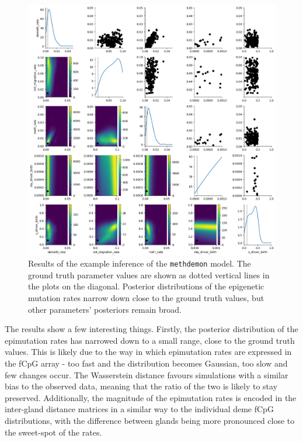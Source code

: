\begin{figure}[h]
    \centering
    \includegraphics[width=\textwidth]{Chapter_4/figures/example_inference.png}
    \caption{Results of the example inference of the \texttt{methdemon} model.
    The ground truth parameter values are shown as dotted vertical lines in the
    plots on the diagonal. Posterior distributions of the epigenetic mutation
    rates narrow down close to the ground truth values, but other parameters'
    posteriors remain broad.}
    \label{fig:example_inference}
\end{figure}
\clearpage
The results show a few interesting things. Firstly, the posterior distribution
of the epimutation rates has narrowed down to a small range, close to the ground
truth values. This is likely due to the way in which epimutation rates are
expressed in the fCpG array - too fast and the distribution becomes Gaussian,
too slow and few changes occur. The Wasserstein distance favours simulations
with a similar bias to the observed data, meaning that the ratio of the two is
likely to stay preserved. Additionally, the magnitude of the epimutation rates
is encoded in the inter-gland distance matrices in a similar way to the individual
deme fCpG distributions, with the difference between glands being more pronounced
close to the sweet-spot of the rates. \par
